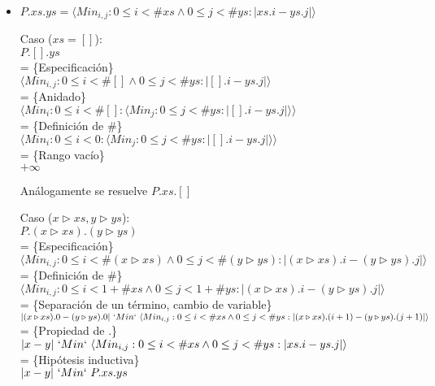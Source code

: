 \documentclass[12pt]{article}
\begin{document}
\begin{itemize}
    \item $ P.xs.ys  = \langle Min_{i,j} : 0 \le i < \#xs \land 0 \le j < \#ys : | xs.i - ys.j | \rangle $

    \bigbreak

    Caso ($xs = []$):\\
    $ P.[].ys $\\
    = \{Especificación\}\\
    $ \langle Min_{i,j} : 0 \le i < \#[] \land 0 \le j < \#ys : | [].i - ys.j | \rangle $\\
    = \{Anidado\}\\
    $ \langle Min_i : 0 \le i < \#[] : \langle Min_j : 0 \le j < \#ys : | [].i - ys.j | \rangle\rangle $\\
    = \{Definición de \#\}\\
    $ \langle Min_i : 0 \le i < 0 : \langle Min_j : 0 \le j < \#ys : | [].i - ys.j | \rangle\rangle $\\
    = \{Rango vacío\}\\
    $ +\infty $

    Análogamente se resuelve $ P.xs.[] $

    \bigbreak

    Caso ($x \triangleright xs, y \triangleright ys$):\\
    $ P.(x \triangleright xs).(y \triangleright ys) $\\
    = \{Especificación\}\\
    $ \langle Min_{i,j} : 0 \le i < \#(x \triangleright xs) \land 0 \le j < \#(y \triangleright ys) : | (x \triangleright xs).i - (y \triangleright ys).j | \rangle $\\
    = \{Definición de \#\}\\
    $ \langle Min_{i,j} : 0 \le i < 1 + \#xs \land 0 \le j < 1 + \#ys : | (x \triangleright xs).i - (y \triangleright ys).j | \rangle $\\
    = \{Separación de un término, cambio de variable\}\\
    $ | (x \triangleright xs).0 - (y \triangleright ys).0 | ~`Min`~ \langle Min_{i,j} : 0 \le i < \#xs \land 0 \le j < \#ys : | (x \triangleright xs).(i + 1) - (y \triangleright ys).(j + 1) | \rangle $\\
    = \{Propiedad de .\}\\
    $ | x - y | ~`Min`~ \langle Min_{i,j} : 0 \le i < \#xs \land 0 \le j < \#ys : | xs.i - ys.j | \rangle $\\
    = \{Hipótesis inductiva\}\\
    $ | x - y | ~`Min`~ P.xs.ys $\\

\end{itemize}
\end{document}
